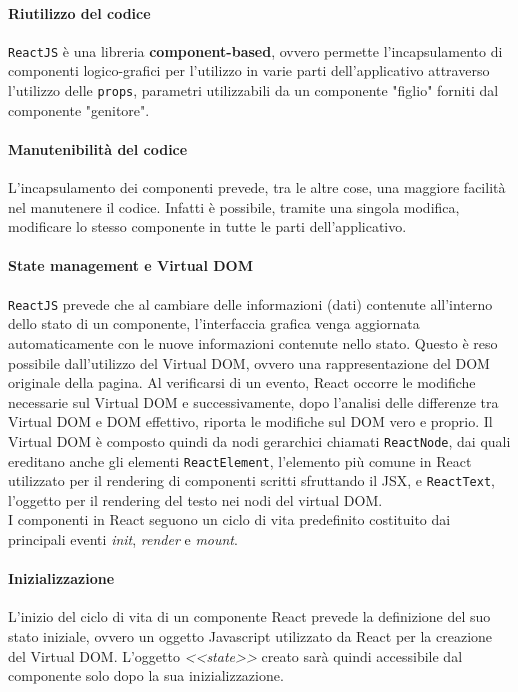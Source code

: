 \paragraph{Riutilizzo del codice} \lstinline[basicstyle=\ttfamily]!ReactJS! è una libreria \textbf{component-based}, ovvero permette l'incapsulamento di componenti logico-grafici per l'utilizzo in varie parti dell'applicativo attraverso l'utilizzo delle \lstinline[basicstyle=\ttfamily]!props!, parametri utilizzabili da un componente "figlio" forniti dal componente "genitore".
\paragraph{Manutenibilità del codice} L'incapsulamento dei componenti prevede, tra le altre cose, una maggiore facilità nel manutenere il codice. Infatti è possibile, tramite una singola modifica, modificare lo stesso componente in tutte le parti dell'applicativo.
\paragraph{State management e Virtual DOM} \lstinline[basicstyle=\ttfamily]!ReactJS! prevede che al cambiare delle informazioni (dati) contenute all'interno dello stato di un componente, l'interfaccia grafica venga aggiornata automaticamente con le nuove informazioni contenute nello stato. Questo è reso possibile dall'utilizzo del Virtual DOM, ovvero una rappresentazione del DOM originale della pagina. Al verificarsi di un evento, React occorre le modifiche necessarie sul Virtual DOM e successivamente, dopo l'analisi delle differenze tra Virtual DOM e DOM effettivo, riporta le modifiche sul DOM vero e proprio. Il Virtual DOM è composto quindi da nodi gerarchici chiamati \lstinline[basicstyle=\ttfamily]!ReactNode!, dai quali ereditano anche gli elementi \lstinline[basicstyle=\ttfamily]!ReactElement!, l'elemento più comune in React utilizzato per il rendering di componenti scritti sfruttando il JSX, e \lstinline[basicstyle=\ttfamily]!ReactText!, l'oggetto per il rendering del testo nei nodi del virtual DOM.
\\[12pt]
I componenti in React seguono un ciclo di vita predefinito costituito dai principali eventi \textit{init}, \textit{render} e \textit{mount}.
\paragraph{Inizializzazione} L'inizio del ciclo di vita di un componente React prevede la definizione del suo stato iniziale, ovvero un oggetto Javascript utilizzato da React per la creazione del Virtual DOM. L'oggetto \textit{<<state>>} creato sarà quindi accessibile dal componente solo dopo la sua inizializzazione.
